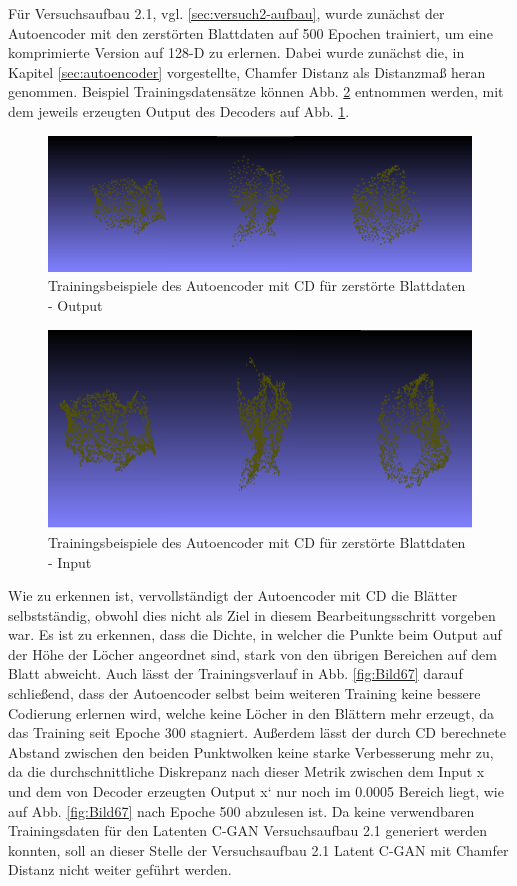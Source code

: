 \documentclass{llncs}
\begin{document}
Für Versuchsaufbau 2.1, vgl. \ref{sec:versuch2-aufbau}, wurde zunächst der Autoencoder mit den zerstörten Blattdaten auf 500 Epochen trainiert, um eine komprimierte Version auf 128-D zu erlernen. Dabei wurde zunächst die, in Kapitel \ref{sec:autoencoder} vorgestellte, Chamfer Distanz als Distanzmaß heran genommen. Beispiel Trainingsdatensätze können Abb. \ref{fig:Bild1003} entnommen werden, mit dem jeweils erzeugten Output des Decoders auf Abb. \ref{fig:Bild68}.  
\begin{figure}[htbp] 
	\centering
	\includegraphics[width=1.0\textwidth]{autoencoder_destroyed_example_chamfer_fake.png}
	\caption{Trainingsbeispiele des Autoencoder mit CD für zerstörte Blattdaten - Output}
	\label{fig:Bild68}
\end{figure}
\begin{figure}[htbp] 
	\centering
	\includegraphics[width=1.0\textwidth]{autoencoder_destroyed_example_chamfer_real.png}
	\caption{Trainingsbeispiele des Autoencoder mit CD für zerstörte Blattdaten - Input}
	\label{fig:Bild1003}
\end{figure}
Wie zu erkennen ist, vervollständigt der Autoencoder mit CD die Blätter selbstständig, obwohl dies nicht als Ziel in diesem Bearbeitungsschritt vorgeben war. Es ist zu erkennen, dass die Dichte, in welcher die Punkte beim Output auf der Höhe der Löcher angeordnet sind, stark von den übrigen Bereichen auf dem Blatt abweicht. 
Auch lässt der Trainingsverlauf in Abb. \ref{fig:Bild67} darauf schließend, dass der Autoencoder selbst beim weiteren Training keine bessere Codierung erlernen wird, welche keine Löcher in den Blättern mehr erzeugt, da das Training  seit Epoche 300 stagniert. Außerdem lässt der durch CD berechnete Abstand zwischen den beiden Punktwolken keine starke Verbesserung mehr zu, da die durchschnittliche Diskrepanz nach dieser Metrik zwischen dem Input x und dem von Decoder erzeugten Output x` nur noch im 0.0005 Bereich liegt, wie auf Abb. \ref{fig:Bild67} nach Epoche 500 abzulesen ist. Da keine verwendbaren Trainingsdaten für den Latenten C-GAN Versuchsaufbau 2.1 generiert werden konnten, soll an dieser Stelle der Versuchsaufbau 2.1 Latent C-GAN  mit Chamfer Distanz nicht weiter geführt werden. 
\end{document}
